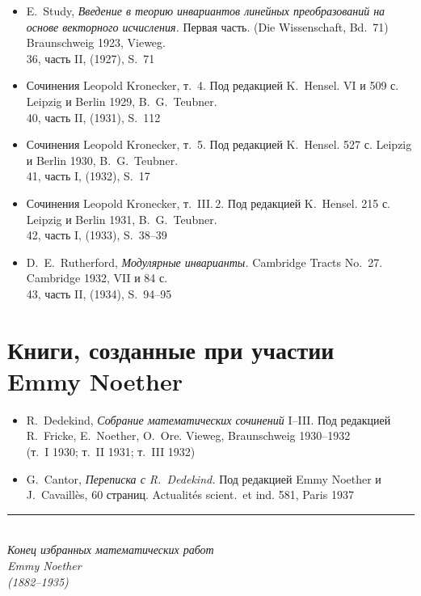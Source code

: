 \documentclass[11pt]{article}
\newcommand{\foreign}[1]{#1}
\begin{document}
\begin{itemize}[leftmargin=1.5em,itemsep=0.2em]
\item E.\ Study, \textit{Введение в теорию инвариантов линейных преобразований на основе векторного исчисления.} Первая часть. (\foreign{Die Wissenschaft}, Bd.~71) Braunschweig 1923, Vieweg.\\
36, часть II, (1927), S.~71

\item Сочинения Leopold Kronecker, т.~4. Под редакцией K.\ Hensel. VI и 509 с. Leipzig и Berlin 1929, B.\ G.\ Teubner.\\
40, часть II, (1931), S.~112

\item Сочинения Leopold Kronecker, т.~5. Под редакцией K.\ Hensel. 527 с. Leipzig и Berlin 1930, B.\ G.\ Teubner.\\
41, часть I, (1932), S.~17

\item Сочинения Leopold Kronecker, т.~III.\,2. Под редакцией K.\ Hensel. 215 с. Leipzig и Berlin 1931, B.\ G.\ Teubner.\\
42, часть I, (1933), S.~38--39

\item D.\ E.\ Rutherford, \textit{Модулярные инварианты.} \foreign{Cambridge Tracts No.~27.} Cambridge 1932, VII и 84 с.\\
43, часть II, (1934), S.~94--95
\end{itemize}

\newpage
\section*{Книги, созданные при участии Emmy Noether}

\begin{itemize}[leftmargin=1.5em,itemsep=0.5em]
\item R.\ Dedekind, \textit{Собрание математических сочинений} I--III. Под редакцией R.\ Fricke, E.\ Noether, O.\ Ore. Vieweg, Braunschweig 1930--1932\\
(т.~I 1930; т.~II 1931; т.~III 1932)

\item G.\ Cantor, \textit{Переписка с R.\ Dedekind.} Под редакцией Emmy Noether и J.\ Cavaillès, 60 страниц. \foreign{Actualités scient.\ et ind.} 581, Paris 1937
\end{itemize}

\vfill

\begin{center}
\rule{0.5\textwidth}{0.4pt}\\[1em]
\textit{Конец избранных математических работ}\\[0.5em]
\textit{Emmy Noether}\\[0.5em]
\textit{(1882--1935)}
\end{center}
\end{document}
